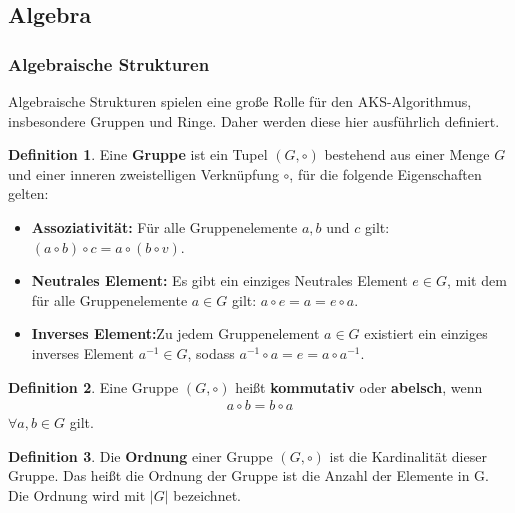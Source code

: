 \documentclass[12pt,oneside]{article}
\theoremstyle{remark}
\theoremstyle{definition}
\newtheorem{definition}{Definition}[section]
\begin{document}

\subsection{Algebra}

\subsubsection{Algebraische Strukturen}
Algebraische Strukturen spielen eine große Rolle für den AKS-Algorithmus, insbesondere Gruppen und Ringe. Daher werden diese hier ausführlich definiert.\newline     
\begin{definition}
Eine \textbf{Gruppe} ist ein Tupel $(G, \circ)$ bestehend aus einer Menge $G$ und einer inneren zweistelligen Verknüpfung $\circ$, für die folgende Eigenschaften gelten:
\begin{itemize}
    \item \textbf{Assoziativität:} Für alle Gruppenelemente $a,b$ und $c$ gilt:\newline
    $(a \circ b) \circ c = a \circ (b \circ v)$.\newline
    \item \textbf{Neutrales Element:} Es gibt ein einziges Neutrales Element $e \in G$, mit dem für alle Gruppenelemente $a \in G$ gilt:\newline
    $a \circ e = a = e \circ a$.\newline
    \item \textbf{Inverses Element:}Zu jedem Gruppenelement $a \in G$ existiert ein einziges inverses Element $a^{-1} \in G$, sodass 
    $a^{-1} \circ a  = e = a \circ a^{-1}$.\newline
\end{itemize}
\end{definition}

\begin{definition}
Eine Gruppe $(G,\circ)$ heißt \textbf{kommutativ} oder \textbf{abelsch}, wenn
\begin{align*}
    a \circ b = b \circ a  
\end{align*}
$\forall a,b \in G$ gilt.
\end{definition}

\smallskip

\begin{definition}
Die \textbf{Ordnung} einer Gruppe $(G, \circ)$ ist die Kardinalität dieser Gruppe. Das heißt die Ordnung der Gruppe ist die Anzahl der Elemente in G. Die Ordnung wird mit $|G|$ bezeichnet. 
\end{definition}
\end{document}
